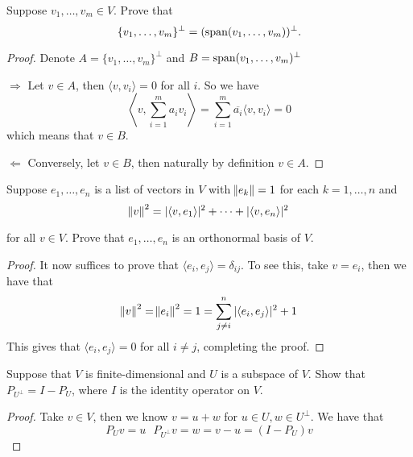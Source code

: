 \documentclass{extarticle}
\begin{document}

\newpage 
{}

\begin{problem}{1}
    Suppose \(v_1, \ldots, v_m \in V\). Prove that 
    \[\{v_1, \ldots, v_m\}^\perp  = (\text{span} (v_1, \ldots, v_m))^\perp. \]
\end{problem}

\begin{proof}
Denote \(A = \{v_1, \ldots, v_m\}^\perp\) and \(B = \text{span} (v_1, \ldots, v_m)^\perp\)

\(\Rightarrow\) Let \( v \in A\), then \(\langle v,v_i \rangle =0 \) for all \(i\). So we have 
\[\left\langle v,\sum_{i=1}^{m} a_i v_i \right\rangle = \sum_{i=1}^{m} \overline{a_i} \langle v,v_i \rangle = 0\]
which means that \(v \in B\). 

\(\Leftarrow\) Conversely, let \(v \in B\), then naturally by definition \(v \in A\).
\end{proof}

\begin{problem}{4}
    Suppose \(e_1, \ldots, e_n\) is a list of vectors in \(V\) with \(\norm{e_k} = 1\) for each 
    \(k = 1, \ldots, n\) and 
    \[\norm{v}^2 = | \langle v,e_1 \rangle |^2 + \cdots + |\langle v,e_n \rangle|^2\]

    for all \(v \in V\). Prove that \(e_1, \ldots, e_n\) is an orthonormal basis of \(V\). 
\end{problem}

\begin{proof}
It now suffices to prove that \(\langle e_i,e_j \rangle = \delta_{ij}\). To see this, take \(v = e_i\), 
then we have that 
\[\norm{v}^2 = \norm{e_i}^2 = 1 = \sum_{j \neq i}^{n} |\langle e_i,e_j \rangle|^2 + 1 \]
This gives that \(\langle e_i,e_j \rangle = 0\) for all \(i \neq j\), completing the proof.
\end{proof}

\begin{problem}{5}
    Suppose that \(V\) is finite-dimensional and \(U\) is a subspace of \(V\). Show that 
    \(P_{U^\perp} = I - P_U\), where \(I\) is the identity operator on \(V\).
\end{problem}

\begin{proof}
Take \(v \in V\), then we know \(v = u + w\) for \(u \in U, w \in U^\perp\). We have that 
\[P_U v = u \ \ \ P_{U^\perp} v = w = v - u = (I - P_U)v\]
\end{proof}
\end{document}
